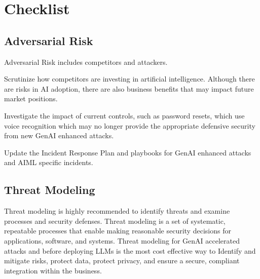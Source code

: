 

\headerimage
\chapter{Checklist}

\section{Adversarial Risk}
Adversarial Risk includes competitors and attackers.

\begin{minipage}{\linewidth}
\begin{checklist}
  \item Scrutinize how competitors are investing in artificial intelligence. Although there are risks in AI adoption, there are also business benefits that may impact future market positions.
  \item Investigate the impact of current controls, such as password resets, which use voice recognition which may no longer provide the appropriate defensive security from new GenAI enhanced attacks.
  \item Update the Incident Response Plan and playbooks for GenAI enhanced attacks and AIML specific incidents.
\end{checklist}
\end{minipage}

\section{Threat Modeling}
Threat modeling is highly recommended to identify threats and examine processes and security defenses. Threat modeling is a set of systematic, repeatable processes that enable making reasonable security decisions for applications, software, and systems. Threat modeling for GenAI accelerated attacks and before deploying LLMs is the most cost effective way to Identify and mitigate risks, protect data, protect privacy, and ensure a secure, compliant integration within the business.

